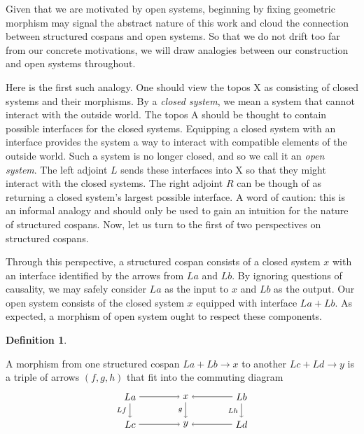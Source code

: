 \documentclass{amsart}
\newcommand{\A}{\cat{A}}
\newcommand{\X}{\cat{X}}
\newcommand{\cat}[1]{\mathrm{#1}}
\newcommand{\csp}[3]{#1 + #3 \to #2}
\theoremstyle{remark}
\theoremstyle{definition}
\newtheorem{definition}[theorem]{Definition}
\begin{document}
Given that we are motivated by open systems, beginning by fixing
geometric morphism may signal the abstract nature of this work and
cloud the connection between structured cospans and open
systems. So that we do not drift too far from our concrete
motivations, we will draw analogies between our construction and open
systems throughout.

Here is the first such analogy. One should view the topos $ \X $ as
consisting of closed systems and their morphisms. By a \emph{closed
  system}, we mean a system that cannot interact with the outside
world. The topos $ \A $ should be thought to contain possible
interfaces for the closed systems. Equipping a closed system with an
interface provides the system a way to interact with compatible
elements of the outside world. Such a system is no longer closed, and
so we call it an \emph{open system}. The left adjoint $ L $ sends
these interfaces into $ \X $ so that they might interact with the
closed systems. The right adjoint $ R $ can be though of as returning
a closed system's largest possible interface. A word of caution: this
is an informal analogy and should only be used to gain an intuition
for the nature of structured cospans. Now, let us turn to the first of
two perspectives on structured cospans.

Through this perspective, a structured cospan consists of a closed
system $ x $ with an interface identified by the arrows from $ La $
and $ Lb $. By ignoring questions of causality, we may safely consider
$ La $ as the input to $ x $ and $ Lb $ as the output. Our open system
consists of the closed system $ x $ equipped with interface
$ La + Lb $. As expected, a morphism of open system
ought to respect these components.

\begin{definition} \label{df:morph-of-strcsp}

  A morphism from one structured cospan
  \(
    \csp{La}{x}{Lb}
  \)
  to another
  \(
    \csp{Lc}{y}{Ld}
  \)
  is a triple of arrows $ ( f,g,h ) $ that fit into the commuting
  diagram
  \[
    \begin{tikzpicture}
      \node (1) at (-2,1) {\( La \)};
      \node (2) at (0,1) {\( x \)};
      \node (3) at (2,1) {\( Lb \)};
      \node (4) at (-2,0) {\( Lc \)};
      \node (5) at (0,0) {\( y \)};
      \node (6) at (2,0) {\( Ld \)};
      \draw [->] (1) to node [above] {\scriptsize{\(  \)}} (2);
      \draw [->] (3) to node [above] {\scriptsize{\(  \)}} (2);
      \draw [->] (4) to node [below] {\scriptsize{\(  \)}} (5);
      \draw [->] (6) to node [below] {\scriptsize{\(  \)}} (5);
      \draw [->] (1) to node [left] {\scriptsize{\( Lf \)}} (4);
      \draw [->] (2) to node [left] {\scriptsize{\( g \)}} (5);
      \draw [->] (3) to node [left] {\scriptsize{\( Lh \)}} (6);
    \end{tikzpicture}
  \]
\end{definition}
\end{document}

